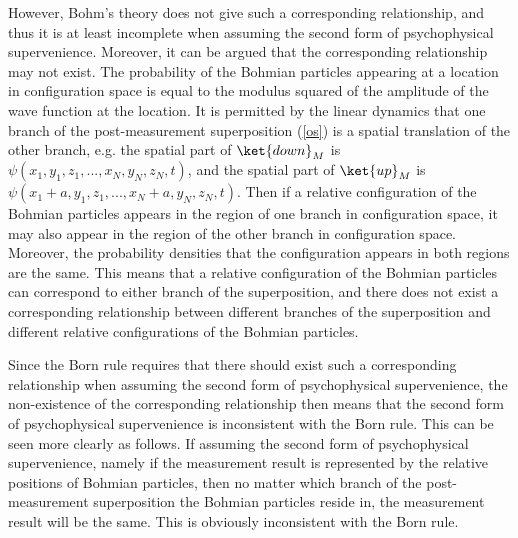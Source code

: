However, Bohm's theory does not give such a corresponding relationship, and thus it is at least incomplete when assuming the second form of psychophysical supervenience.
Moreover, it can be argued that the corresponding relationship may not exist. %
The probability of the Bohmian particles appearing at a location in configuration space is equal to the modulus squared of the amplitude of the wave function at the location.
It is permitted by the linear dynamics that one branch of the post-measurement superposition (\ref{os}) is a spatial translation of the other branch, e.g. the spatial part of $\ket{down}_M$ is $\psi(x_1,y_1,z_1,..., x_N,y_N,z_N,t)$, and the spatial part of $\ket{up}_M$ is $\psi(x_1+a,y_1,z_1,..., x_N+a,y_N,z_N,t)$.
Then if a relative configuration of the Bohmian particles appears in the region of one branch in configuration space, it may also appear in the region of the other branch in configuration space. Moreover, the probability densities that the configuration appears in both regions are the same. 
This means that a relative configuration of the Bohmian particles can correspond to either branch of the superposition, and there does not exist a corresponding relationship between different branches of the superposition and different relative configurations of the Bohmian particles.

Since the Born rule requires that there should exist such a corresponding relationship when assuming the second form of psychophysical supervenience, the non-existence of the corresponding relationship then means that the second form of psychophysical supervenience is inconsistent with the Born rule. This can be seen more clearly as follows. If assuming the second form of psychophysical supervenience, namely if the measurement result is represented by the relative positions of Bohmian particles, then no matter which branch of the post-measurement superposition the Bohmian particles reside in, the measurement result will be the same. This is obviously inconsistent with the Born rule.

